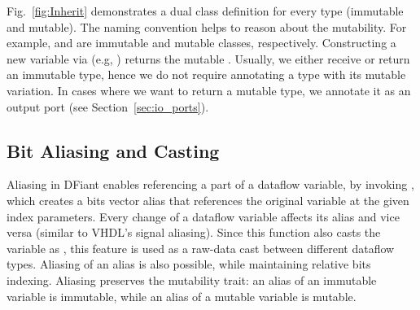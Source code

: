 Fig.~\ref{fig:Inherit} demonstrates a dual class definition for every type  (immutable and mutable). The naming convention helps to reason about the mutability. For example,  and  are immutable and mutable classes, respectively. Constructing a new variable via  (e.g, ) returns the mutable . Usually, we either receive or return an immutable type, hence we do not require annotating a type with its mutable variation. In cases where we want to return a mutable type, we annotate it as an output port (see Section~\ref{sec:io_ports}).





\subsection{Bit Aliasing and Casting}
Aliasing in DFiant enables referencing a part of a dataflow variable, by invoking , which creates a bits vector alias that references the original variable at the given index parameters. Every change of a dataflow variable affects its alias and vice versa (similar to VHDL's signal aliasing). Since this function also casts the variable as , this feature is used as a raw-data cast between different dataflow types. Aliasing of an alias is also possible, while maintaining relative bits indexing. Aliasing preserves the mutability trait: an alias of an immutable variable is immutable, while an alias of a mutable variable is mutable. 


